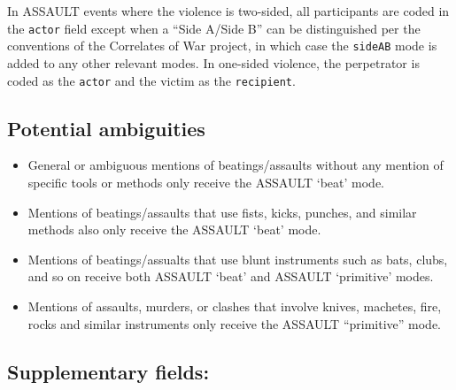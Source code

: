 \documentclass[11pt]{report}
\newcommand{\plcat}[1]{\textsf{#1}}
\newcommand{\plmod}[1]{\texttt{#1}}
\newcommand{\txt}[1]{\texttt{#1}}
\begin{document}
In \plcat{ASSAULT} events where the violence is two-sided, all participants are coded in the \txt{actor} field except when a ``Side A/Side B'' can be distinguished per the conventions of the Correlates of War project, in which case the \plmod{sideAB} mode is added to any other relevant modes. In one-sided violence, the perpetrator is coded as the \txt{actor} and the victim as the \txt{recipient}.


\subsection{Potential ambiguities}
\begin{itemize}
\item General or ambiguous mentions of beatings/assaults without any mention of specific tools or methods only receive the \plcat{ASSAULT} `beat' mode.

\item Mentions of beatings/assaults that use fists, kicks, punches, and similar methods also only receive the  \plcat{ASSAULT} `beat' mode.

\item Mentions of beatings/assualts that use blunt instruments such as bats, clubs, and so on receive both \plcat{ASSAULT}  `beat' and  \plcat{ASSAULT} `primitive' modes.
\item Mentions of assaults, murders, or clashes that involve knives, machetes, fire, rocks and similar instruments only receive the  \plcat{ASSAULT} ``primitive'' mode.
\end{itemize}
\subsection{Supplementary fields:}
\end{document}
